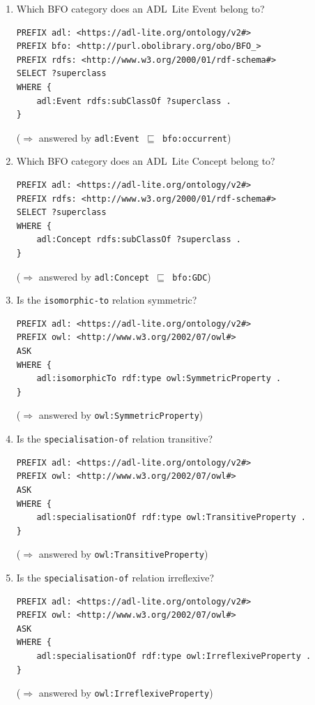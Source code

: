 \begin{enumerate}[label=CQ\arabic*:,leftmargin=3em]

    \item Which BFO category does an ADL~Lite Event belong to?
    \begin{verbatim}
PREFIX adl: <https://adl-lite.org/ontology/v2#>
PREFIX bfo: <http://purl.obolibrary.org/obo/BFO_>
PREFIX rdfs: <http://www.w3.org/2000/01/rdf-schema#>
SELECT ?superclass
WHERE {
    adl:Event rdfs:subClassOf ?superclass .
}
    \end{verbatim}
    ($\Rightarrow$ answered by \texttt{adl:Event $\sqsubseteq$ bfo:occurrent})

    \item Which BFO category does an ADL~Lite Concept belong to?
    \begin{verbatim}
PREFIX adl: <https://adl-lite.org/ontology/v2#>
PREFIX rdfs: <http://www.w3.org/2000/01/rdf-schema#>
SELECT ?superclass
WHERE {
    adl:Concept rdfs:subClassOf ?superclass .
}
    \end{verbatim}
    ($\Rightarrow$ answered by \texttt{adl:Concept $\sqsubseteq$ bfo:GDC})

    \item Is the \texttt{isomorphic-to} relation symmetric?
    \begin{verbatim}
PREFIX adl: <https://adl-lite.org/ontology/v2#>
PREFIX owl: <http://www.w3.org/2002/07/owl#>
ASK
WHERE {
    adl:isomorphicTo rdf:type owl:SymmetricProperty .
}
    \end{verbatim}
    ($\Rightarrow$ answered by \texttt{owl:SymmetricProperty})

    \item Is the \texttt{specialisation-of} relation transitive?
    \begin{verbatim}
PREFIX adl: <https://adl-lite.org/ontology/v2#>
PREFIX owl: <http://www.w3.org/2002/07/owl#>
ASK
WHERE {
    adl:specialisationOf rdf:type owl:TransitiveProperty .
}
    \end{verbatim}
    ($\Rightarrow$ answered by \texttt{owl:TransitiveProperty})

    \item Is the \texttt{specialisation-of} relation irreflexive?
    \begin{verbatim}
PREFIX adl: <https://adl-lite.org/ontology/v2#>
PREFIX owl: <http://www.w3.org/2002/07/owl#>
ASK
WHERE {
    adl:specialisationOf rdf:type owl:IrreflexiveProperty .
}
    \end{verbatim}
    ($\Rightarrow$ answered by \texttt{owl:IrreflexiveProperty})


\end{enumerate}
